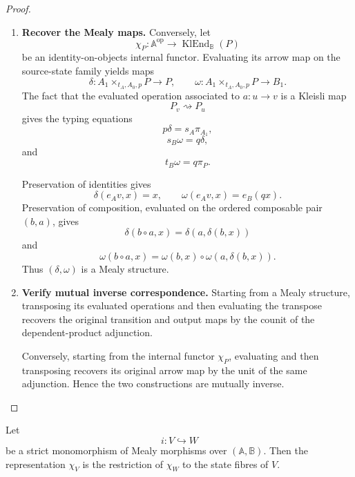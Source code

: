 \begin{proof}
\begin{enumerate}
        \item \textbf{Recover the Mealy maps.}
        Conversely, let
        \[
            \chi_P:
            \mathbb A^{\mathrm{op}}
            \to
            \operatorname{KlEnd}_{\mathbb B}(P)
        \]
        be an identity-on-objects internal functor. Evaluating its arrow map
        on the source-state family yields maps
        \[
            \delta:
            A_1\times_{t_A,A_0,p}P\to P,
            \qquad
            \omega:
            A_1\times_{t_A,A_0,p}P\to B_1.
        \]
        The fact that the evaluated operation associated to
        \(a:u\to v\) is a Kleisli map
        \[
            P_v\rightsquigarrow P_u
        \]
        gives the typing equations
        \[
            p\delta=s_A\pi_{A_1},
        \]
        \[
            s_B\omega=q\delta,
        \]
        and
        \[
            t_B\omega=q\pi_P.
        \]

        Preservation of identities gives
        \[
            \delta(e_Av,x)=x,
            \qquad
            \omega(e_Av,x)=e_B(qx).
        \]
        Preservation of composition, evaluated on the ordered composable pair
        \((b,a)\), gives
        \[
            \delta(b\circ a,x)
            =
            \delta(a,\delta(b,x))
        \]
        and
        \[
            \omega(b\circ a,x)
            =
            \omega(b,x)\circ
            \omega(a,\delta(b,x)).
        \]
        Thus \((\delta,\omega)\) is a Mealy structure.

        \item \textbf{Verify mutual inverse correspondence.}
        Starting from a Mealy structure, transposing its evaluated operations
        and then evaluating the transpose recovers the original transition
        and output maps by the counit of the dependent-product adjunction.

        Conversely, starting from the internal functor \(\chi_P\), evaluating
        and then transposing recovers its original arrow map by the unit of
        the same adjunction. Hence the two constructions are mutually
        inverse.
    \end{enumerate}
\end{proof}

\begin{lemma}
\label{lem:to-restriction-representations}
    Let
    \[
        i:V\hookrightarrow W
    \]
    be a strict monomorphism of Mealy morphisms over
    \((\mathbb A,\mathbb B)\). Then the representation \(\chi_V\) is the
    restriction of \(\chi_W\) to the state fibres of \(V\).
\end{lemma}

